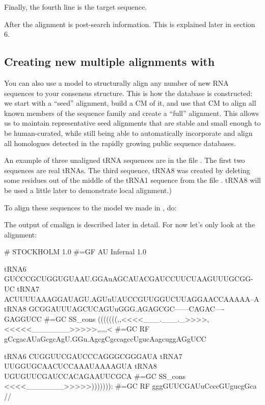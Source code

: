 Finally, the fourth line is the target sequence.

After the alignment is post-search information. This is explained
later in section 6. 

\subsection{Creating new multiple alignments with }

You can also use a model to structurally align any number of new RNA
sequences to your consensus structure. This is how the 
database is constructed: we start with a ``seed'' alignment, build a CM
of it, and use that CM to align all known members of the sequence
family and create a ``full'' alignment. This allows us to maintain
representative seed alignments that are stable and small enough to be
human-curated, while still being able to automatically incorporate and
align all homologues detected in the rapidly growing public sequence
databases.

An example of three unaligned tRNA sequences are in the file
. The first two sequences are real tRNAs. The third
sequence, tRNA8 was created by deleting some residues out of the middle
of the tRNA1 sequence from the file . tRNA8 will be used a little later to
demonstrate local alignment.)

To align these sequences to the model we made in , do:


The output of cmalign is described later in detail. For now let's only
look at the alignment:

{\samepage
\begin{sreoutput}
# STOCKHOLM 1.0
#=GF AU Infernal 1.0

tRNA6        GUCCCGCUGGUGUAAU.GGAuAGCAUACGAUCCUUCUAAGUUUGCGG-UC
tRNA7        ACUUUUAAAGGAUAGU.AGUuUAUCCGUUGGUCUUAGGAACCAAAAA--A
tRNA8        GCGGAUUUAGCUCAGUuGGG.AGAGCGC------CAGAC----GAGGUCC
#=GC SS_cons (((((((,,<<<<___.___._>>>>,<<<<<_______>>>>>,,,,,<
#=GC RF      gCcgacAUaGcgcAgU.GGu.AgcgCgccagccUgucAagcuggAGgUCC

tRNA6        CUGGUUCGAUCCCAGGGCGGGAUA
tRNA7        UUGGUGCAACUCCAAAUAAAAGUA
tRNA8        UGUGUUCGAUCCACAGAAUUCGCA
#=GC SS_cons <<<<_______>>>>>))))))):
#=GC RF      gggGUUCGAUuCcccGUgucgGca
//
\end{sreoutput}
}

